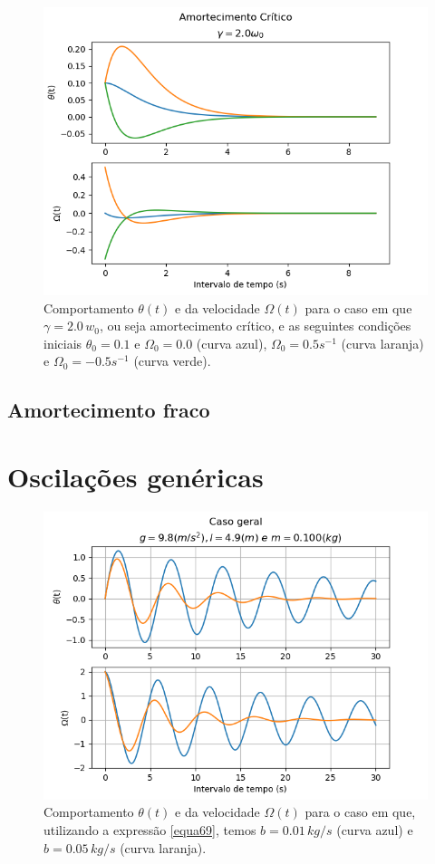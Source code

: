 \documentclass[12pt,openright,twoside,english,brazil]{abntex2}
\begin{document}
\begin{figure}[t]
 \centering
 \includegraphics[width=1.0\linewidth]{critico-1.png}
 \caption{Comportamento $\theta(t)$ e da velocidade $\Omega(t)$ para o caso em que $\gamma=2.0\, w_0$, ou seja amortecimento crítico, e as seguintes condições iniciais $\theta_0=0.1$ e $\Omega_0=0.0$ (curva azul), $\Omega_0=0.5s^{-1}$ (curva laranja) e $\Omega_0=-0.5s^{-1}$ (curva verde).}
 \label{Figura13}
\end{figure}

\subsection{Amortecimento fraco}

\section{Oscilações genéricas}



\begin{figure}[t]
 \centering
 \includegraphics[width=1.0\linewidth]{caso-geral-1.png}
 \caption{Comportamento $\theta(t)$ e da velocidade $\Omega(t)$ para o caso em que, utilizando a expressão \ref{equa69}, temos $b=0.01\, kg/s$ (curva azul) e $b=0.05\, kg/s$ (curva laranja).}
 \label{Figura14}
\end{figure}
\end{document}
